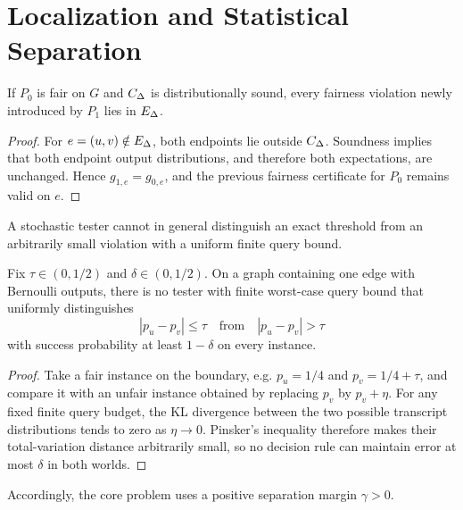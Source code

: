 \section{Localization and Statistical Separation}
\label{arch:sec:localization}

\begin{proposition}
\label{arch:prop:localization}
If $P_0$ is fair on $G$ and $C_{\Delta}$ is distributionally sound, every fairness
violation newly introduced by $P_1$ lies in $E_{\Delta}$.
\end{proposition}

\begin{proof}
For $e=(u,v)\notin E_{\Delta}$, both endpoints lie outside $C_{\Delta}$.  Soundness
implies that both endpoint output distributions, and therefore both expectations,
are unchanged.  Hence $g_{1,e}=g_{0,e}$, and the previous fairness certificate for
$P_0$ remains valid on $e$.
\end{proof}

A stochastic tester cannot in general distinguish an exact threshold from an
arbitrarily small violation with a uniform finite query bound.

\begin{proposition}
\label{arch:prop:zero-margin}
Fix $\tau\in(0,1/2)$ and $\delta\in(0,1/2)$.  On a graph containing one edge with
Bernoulli outputs, there is no tester with finite worst-case query bound that
uniformly distinguishes
\begin{equation}\label{eq:appendix-03-localization-001}
|p_u-p_v|\le\tau
\quad\text{from}\quad
|p_u-p_v|>\tau
\end{equation}
with success probability at least $1-\delta$ on every instance.
\end{proposition}

\begin{proof}
Take a fair instance on the boundary, e.g. $p_u=1/4$ and
$p_v=1/4+\tau$, and compare it with an unfair instance obtained by replacing
$p_v$ by $p_v+\eta$.  For any fixed finite query budget, the KL divergence between
the two possible transcript distributions tends to zero as $\eta\to0$.  Pinsker's
inequality therefore makes their total-variation distance arbitrarily small, so
no decision rule can maintain error at most $\delta$ in both worlds.
\end{proof}

Accordingly, the core problem uses a positive separation margin $\gamma>0$.

